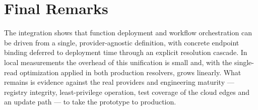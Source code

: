 \section{Final Remarks}
\label{sec:concl-final}

The integration shows that function deployment and workflow orchestration can be driven from a
single, provider-agnostic definition, with concrete endpoint binding deferred to deployment time
through an explicit resolution cascade. In local measurements the overhead of this unification is
small and, with the single-read optimization applied in both production resolvers, grows linearly.
What remains is evidence against the real providers and engineering maturity --- registry
integrity, least-privilege operation, test coverage of the cloud edges and an update path --- to
take the prototype to production.
